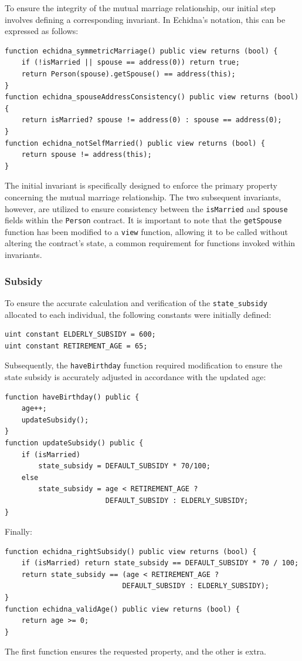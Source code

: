 \documentclass[a4paper,10pt]{article}
\begin{document}
To ensure the integrity of the mutual marriage relationship, our initial step involves defining a corresponding invariant. In Echidna's notation, this can be expressed as follows:


\begin{verbatim}
function echidna_symmetricMarriage() public view returns (bool) {
    if (!isMarried || spouse == address(0)) return true;
    return Person(spouse).getSpouse() == address(this);
}
function echidna_spouseAddressConsistency() public view returns (bool) {
    return isMarried? spouse != address(0) : spouse == address(0);
}
function echidna_notSelfMarried() public view returns (bool) {
    return spouse != address(this);
}
\end{verbatim}

The initial invariant is specifically designed to enforce the primary property concerning the mutual marriage relationship. The two subsequent invariants, however, are utilized to ensure consistency between the \verb|isMarried| and \verb|spouse |fields within the \verb|Person| contract. It is important to note that the \verb|getSpouse| function has been modified to a \verb|view| function, allowing it to be called without altering the contract's state, a common requirement for functions invoked within invariants.

\subsubsection{Subsidy}

To ensure the accurate calculation and verification of the \verb|state_subsidy| allocated to each individual, the following constants were initially defined:
\begin{verbatim}
uint constant ELDERLY_SUBSIDY = 600;
uint constant RETIREMENT_AGE = 65;
\end{verbatim}
Subsequently, the \verb|haveBirthday| function required modification to ensure the state subsidy is accurately adjusted in accordance with the updated age:
\begin{verbatim}
function haveBirthday() public {
    age++;
    updateSubsidy();
}
function updateSubsidy() public {
    if (isMarried)
        state_subsidy = DEFAULT_SUBSIDY * 70/100; 
    else
        state_subsidy = age < RETIREMENT_AGE ? 
                        DEFAULT_SUBSIDY : ELDERLY_SUBSIDY;
}
\end{verbatim}
Finally:
\begin{verbatim}
function echidna_rightSubsidy() public view returns (bool) {
    if (isMarried) return state_subsidy == DEFAULT_SUBSIDY * 70 / 100;
    return state_subsidy == (age < RETIREMENT_AGE ? 
                            DEFAULT_SUBSIDY : ELDERLY_SUBSIDY);
}
function echidna_validAge() public view returns (bool) {
    return age >= 0;
}
\end{verbatim}
The first function ensures the requested property, and the other is extra.
\begin{verbatim}
    
\end{verbatim}
\end{document}
